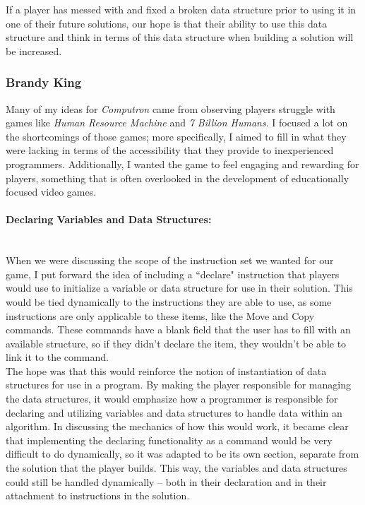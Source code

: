 If a player has messed with and fixed a broken data structure prior to using it in one of their future solutions, our hope is that their ability to use this data structure and think in terms of this data structure when building a solution will be increased.\\

\subsubsection{Brandy King}
Many of my ideas for \textit{Computron} came from observing players struggle with games like \textit{Human Resource Machine} and \textit{7 Billion Humans}. I focused a lot on the shortcomings of those games; more specifically, I aimed to fill in what they were lacking in terms of the accessibility that they provide  to inexperienced programmers. Additionally, I wanted the game to feel engaging and rewarding for players, something that is often overlooked in the development of educationally focused video games. \\

\paragraph{Declaring Variables and Data Structures:} ~\\
When we were discussing the scope of the instruction set we wanted for our game, I put forward the idea of including a ``declare" instruction that players would use to initialize a variable or data structure for use in their solution. This would be tied dynamically to the instructions they are able to use, as some instructions are only applicable to these items, like the Move and Copy commands. These commands have a blank field that the user has to fill with an available structure, so if they didn't declare the item, they wouldn't be able to link it to the command.\\

The hope was that this would reinforce the notion of instantiation of data structures for use in a program. By making the player responsible for managing the data structures, it would emphasize how a programmer is responsible for declaring and utilizing variables and data structures to handle data within an algorithm. In discussing the mechanics of how this would work, it became clear that implementing the declaring functionality as a command would be very difficult to do dynamically, so it was adapted to be its own section, separate from the solution that the player builds. This way, the variables and data structures could still be handled dynamically -- both in their declaration and in their attachment to instructions in the solution.\\

